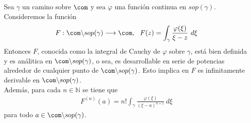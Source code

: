\begin{teo}
Sea $\gamma$ un camino sobre $\com$ y sea $\varphi$ una función continua en $sop(\gamma)$. Consideremos la función
\begin{align*}
    F : \com \backslash sop(\gamma) \longrightarrow \com, \ \ F(z) = \int_{\gamma}{\frac{\varphi(\xi)}{\xi - z} \ d\xi}
\end{align*}
Entonces $F$, conocida como la integral de Cauchy de $\varphi$ sobre $\gamma$, está bien definida y es análitica en $\com \backslash sop(\gamma)$, o sea, es desarrollable en serie de potencias alrededor de cualquier punto de $\com \backslash sop(\gamma)$. Esto implica en $F$ es infinitamente derivable en $\com \backslash sop(\gamma)$.
\\
\newline
Además, para cada $n \in \mathbb{N}$ se tiene que
\begin{align*}
    F^{(n)}(a) = n! \int_{\gamma}{\frac{\varphi(\xi)}{(\xi - a)^{n+1}} \ d\xi}
\end{align*}
para todo $a \in \com \backslash sop(\gamma)$.
\end{teo}

